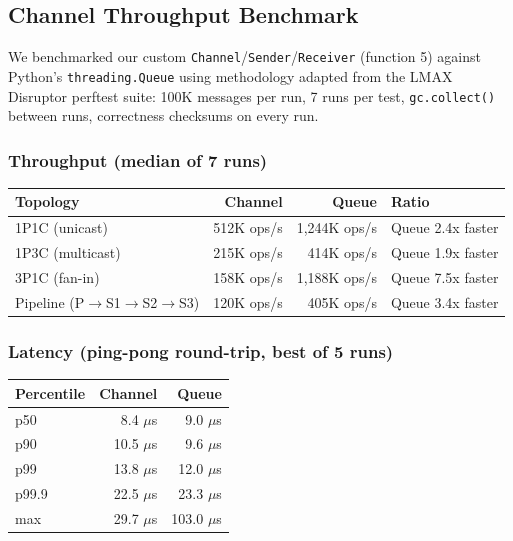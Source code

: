 \subsection{Channel Throughput Benchmark}

We benchmarked our custom \texttt{Channel}/\texttt{Sender}/\texttt{Receiver} (function 5) against Python's \texttt{threading.Queue} using methodology adapted from the LMAX Disruptor perftest suite: 100K messages per run, 7 runs per test, \texttt{gc.collect()} between runs, correctness checksums on every run.

\subsubsection{Throughput (median of 7 runs)}

\begin{table}[h]
\centering
\begin{tabular}{|l|r|r|l|}
\hline
\textbf{Topology} & \textbf{Channel} & \textbf{Queue} & \textbf{Ratio} \\
\hline
1P1C (unicast) & 512K ops/s & 1,244K ops/s & Queue 2.4x faster \\
1P3C (multicast) & 215K ops/s & 414K ops/s & Queue 1.9x faster \\
3P1C (fan-in) & 158K ops/s & 1,188K ops/s & Queue 7.5x faster \\
Pipeline (P$\rightarrow$S1$\rightarrow$S2$\rightarrow$S3) & 120K ops/s & 405K ops/s & Queue 3.4x faster \\
\hline
\end{tabular}
\end{table}

\subsubsection{Latency (ping-pong round-trip, best of 5 runs)}

\begin{table}[h]
\centering
\begin{tabular}{|l|r|r|}
\hline
\textbf{Percentile} & \textbf{Channel} & \textbf{Queue} \\
\hline
p50 & 8.4 $\mu$s & 9.0 $\mu$s \\
p90 & 10.5 $\mu$s & 9.6 $\mu$s \\
p99 & 13.8 $\mu$s & 12.0 $\mu$s \\
p99.9 & 22.5 $\mu$s & 23.3 $\mu$s \\
max & 29.7 $\mu$s & 103.0 $\mu$s \\
\hline
\end{tabular}
\end{table}

